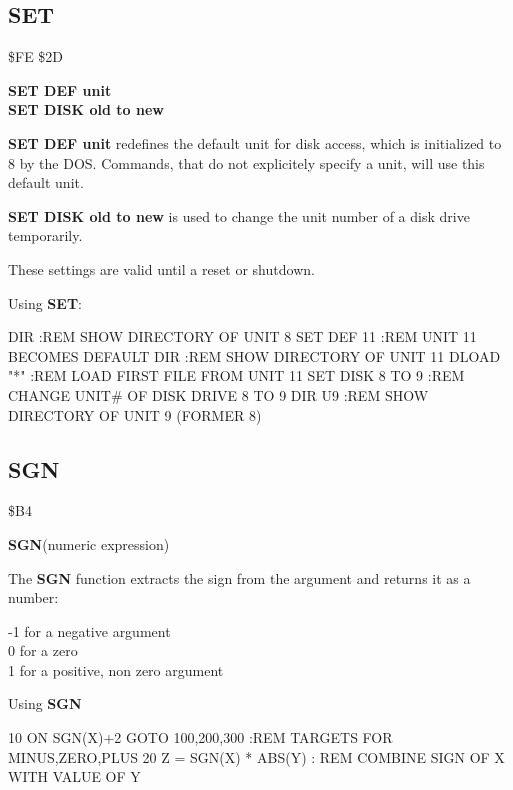 
\newpage
\subsection{SET}
\begin{description}[leftmargin=3cm,style=nextline]
\item [Token:] \$FE \$2D
\item [Format:] {\bf SET DEF unit} \\
                {\bf SET DISK old to new}
\item [Usage:]  {\bf SET DEF unit} redefines the default unit
                for disk access, which is initialized to 8 by
                the DOS. Commands, that do not explicitely
                specify a unit, will use this default unit.

                {\bf SET DISK old to new} is used to change
                the unit number of a disk drive temporarily.

\item [Remarks:] These settings are valid until a reset
                 or shutdown.

\item [Example:] Using {\bf SET}:
\begin{screenoutput}
 DIR             :REM SHOW DIRECTORY OF UNIT 8
 SET DEF 11      :REM UNIT 11 BECOMES DEFAULT
 DIR             :REM SHOW DIRECTORY OF UNIT 11
 DLOAD "*"       :REM LOAD FIRST FILE FROM UNIT 11
 SET DISK 8 TO 9 :REM CHANGE UNIT# OF DISK DRIVE 8 TO 9
 DIR U9          :REM SHOW DIRECTORY OF UNIT 9 (FORMER 8)
\end{screenoutput}
\end{description}


\newpage
\subsection{SGN}
\begin{description}[leftmargin=3cm,style=nextline]
\item [Token:] \$B4
\item [Format:] {\bf SGN}(numeric expression)
\item [Usage:] The {\bf SGN} function extracts the sign from
               the argument and returns it as a number:

               -1 for a negative argument \\
                0 for a zero              \\
                1 for a positive, non zero argument

\item [Example:] Using {\bf SGN}
\begin{screenoutput}
10 ON SGN(X)+2 GOTO 100,200,300 :REM TARGETS FOR MINUS,ZERO,PLUS
20 Z = SGN(X) * ABS(Y) : REM COMBINE SIGN OF X WITH VALUE OF Y
\end{screenoutput}
\end{description}

